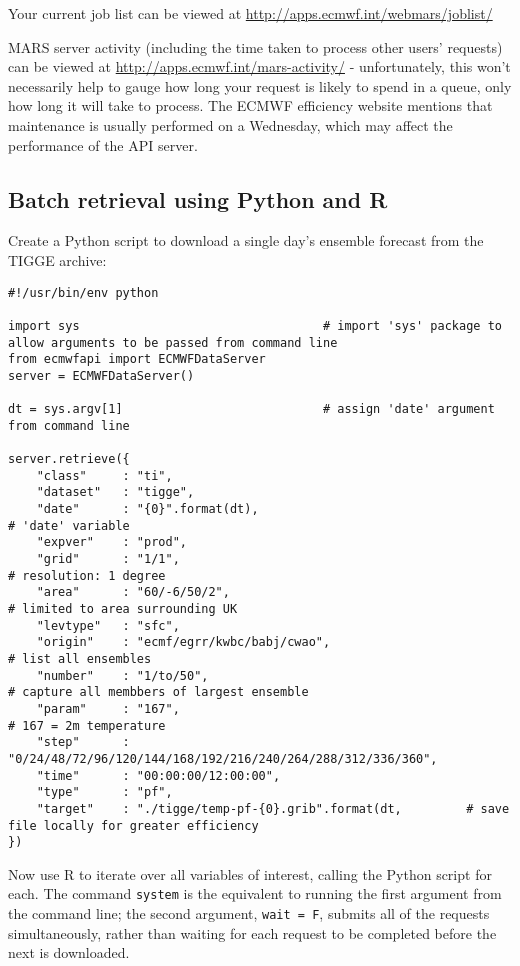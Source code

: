 \documentclass[10pt,fleqn]{article}
\begin{document}
Your current job list can be viewed at \url{http://apps.ecmwf.int/webmars/joblist/}

MARS server activity (including the time taken to process other users' requests) can be viewed at \url{http://apps.ecmwf.int/mars-activity/} - unfortunately, this won't necessarily help to gauge how long your request is likely to spend in a queue, only how long it will take to process. The ECMWF efficiency website mentions that maintenance is usually performed on a Wednesday, which may affect the performance of the API server.

\newpage

\subsection{Batch retrieval using Python and R}
Create a Python script to download a single day's ensemble forecast from the TIGGE archive:

\begin{lstlisting}
#!/usr/bin/env python
	
import sys									# import 'sys' package to allow arguments to be passed from command line
from ecmwfapi import ECMWFDataServer
server = ECMWFDataServer()

dt = sys.argv[1]							# assign 'date' argument from command line

server.retrieve({
	"class"		: "ti",
	"dataset"	: "tigge",
	"date"		: "{0}".format(dt),												# 'date' variable 
	"expver"	: "prod",
	"grid"		: "1/1",														# resolution: 1 degree
	"area"		: "60/-6/50/2",													# limited to area surrounding UK
	"levtype"	: "sfc",
	"origin"	: "ecmf/egrr/kwbc/babj/cwao",									# list all ensembles
	"number"	: "1/to/50",													# capture all membbers of largest ensemble
	"param"		: "167",														# 167 = 2m temperature
	"step"		: "0/24/48/72/96/120/144/168/192/216/240/264/288/312/336/360",
	"time"		: "00:00:00/12:00:00",
	"type"		: "pf",
	"target"	: "./tigge/temp-pf-{0}.grib".format(dt,			# save file locally for greater efficiency
})
\end{lstlisting}


Now use R to iterate over all variables of interest, calling the Python script for each. The command \texttt{system} is the equivalent to running the first argument from the command line; the second argument, \texttt{wait = F}, submits all of the requests simultaneously, rather than waiting for each request to be completed before the next is downloaded.
\end{document}
